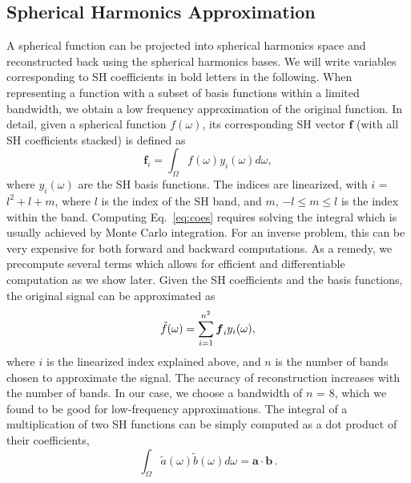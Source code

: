 \subsection{Spherical Harmonics Approximation}
%
\label{sec:methodSphericalHarmonics}
%
A spherical function can be projected into spherical harmonics space and reconstructed back using the spherical harmonics bases. 
%
We will write variables corresponding to SH coefficients in bold letters in the following. 
%
When representing a function with a subset of basis functions within a limited bandwidth, we obtain a low frequency approximation of the original function. 
%
In detail, given a spherical function $f(\omega)$, its corresponding SH vector $\boldsymbol{f}$ (with all SH coefficients stacked) is defined as
%
%
\begin{equation}
\label{eq:coes}
\boldsymbol{f}_i=\int_{\Omega} f(\omega) y_i(\omega) d \omega ,
\end{equation} 
%
%
where $y_i(\omega)$ are the SH basis functions.
%
The indices are linearized, with $i$ = ${l^{2}+l+m}$, where $l$ is the index of the SH band, and $m$, $-l\leq m \leq l$ is the index within the band. 
%
Computing Eq.~\ref{eq:coes} requires solving the integral which is usually achieved by Monte Carlo integration. 
%
For an inverse problem, this can be very expensive for both forward and backward computations.
%
As a remedy, we precompute several terms which allows for efficient and differentiable computation as we show later. 
%
Given the SH coefficients and the basis functions, the original signal can be approximated as 
%
%
\begin{equation}
\Tilde{f}(\omega) = \sum_{i=1}^{n^2} \boldsymbol{f}_i y_i(\omega) ,
\end{equation}
%
%
where $i$ is the linearized index explained above, and $n$ is the number of bands chosen to approximate the signal. 
%
The accuracy of reconstruction increases with the number of bands. 
%
In our case, we choose a bandwidth of $n$ = 8, which we found to be good for low-frequency approximations.
%
The integral of a multiplication of two SH functions can be simply computed as a dot product of their coefficients, 
%
%
\begin{equation}
\int_{\Omega} \tilde{a}(\omega) \tilde{b}(\omega) d\omega = \mathbf{a} \cdot \mathbf{b} \,.
\end{equation}
%
